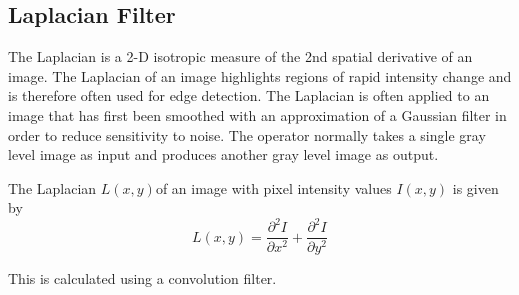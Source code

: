 \documentclass[conference]{IEEEtran}
\begin{document}


\subsection{Laplacian Filter}
The Laplacian is a 2-D isotropic measure of the 2nd spatial derivative
of an image. The Laplacian of an image highlights regions of rapid
intensity change and is therefore often used for edge detection. The
Laplacian is often applied to an image that has first been smoothed
with an approximation of a Gaussian filter in order to reduce
sensitivity to noise. The operator normally takes a single gray level
image as input and produces another gray level image as output.

The Laplacian \begin{math} L(x,y)\end{math}of an image with pixel
intensity values \begin{math}I(x,y)\end{math} is given by
\begin{equation}
L(x,y) = \frac{\partial^2 I}{\partial x^2} + \frac{\partial^2 I}{\partial y^2}
\end{equation} 

This is calculated using a convolution filter.
\end{document}
